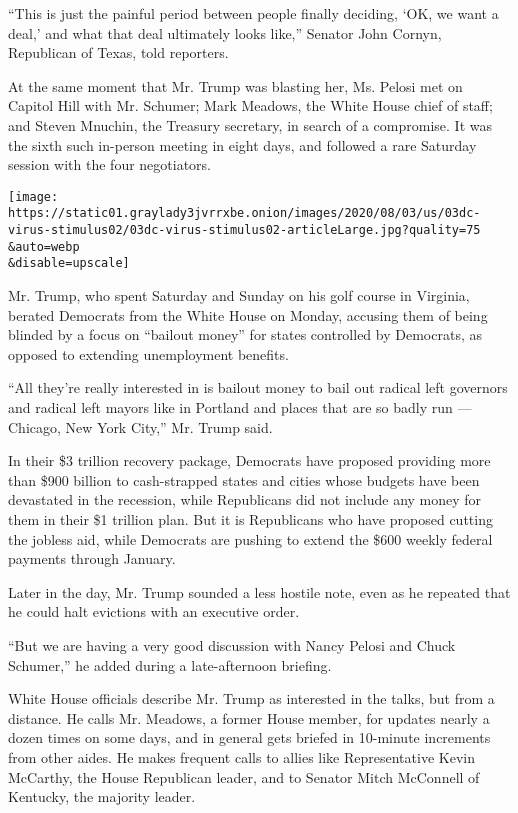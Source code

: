 ``This is just the painful period between people finally deciding, `OK,
we want a deal,' and what that deal ultimately looks like,'' Senator
John Cornyn, Republican of Texas, told reporters.

At the same moment that Mr. Trump was blasting her, Ms. Pelosi met on
Capitol Hill with Mr. Schumer; Mark Meadows, the White House chief of
staff; and Steven Mnuchin, the Treasury secretary, in search of a
compromise. It was the sixth such in-person meeting in eight days, and
followed a rare Saturday session with the four negotiators.

\texttt{[image: https://static01.graylady3jvrrxbe.onion/images/2020/08/03/us/03dc-virus-stimulus02/03dc-virus-stimulus02-articleLarge.jpg?quality=75\\\&auto=webp\\\&disable=upscale]}

Mr. Trump, who spent Saturday and Sunday on his golf course in Virginia,
berated Democrats from the White House on Monday, accusing them of being
blinded by a focus on ``bailout money'' for states controlled by
Democrats, as opposed to extending unemployment benefits.

``All they're really interested in is bailout money to bail out radical
left governors and radical left mayors like in Portland and places that
are so badly run --- Chicago, New York City,'' Mr. Trump said.

In their \$3 trillion recovery package, Democrats have proposed
providing more than \$900 billion to cash-strapped states and cities
whose budgets have been devastated in the recession, while Republicans
did not include any money for them in their \$1 trillion plan. But it is
Republicans who have proposed cutting the jobless aid, while Democrats
are pushing to extend the \$600 weekly federal payments through January.

Later in the day, Mr. Trump sounded a less hostile note, even as he
repeated that he could halt evictions with an executive order.

``But we are having a very good discussion with Nancy Pelosi and Chuck
Schumer,'' he added during a late-afternoon briefing.

White House officials describe Mr. Trump as interested in the talks, but
from a distance. He calls Mr. Meadows, a former House member, for
updates nearly a dozen times on some days, and in general gets briefed
in 10-minute increments from other aides. He makes frequent calls to
allies like Representative Kevin McCarthy, the House Republican leader,
and to Senator Mitch McConnell of Kentucky, the majority leader.

